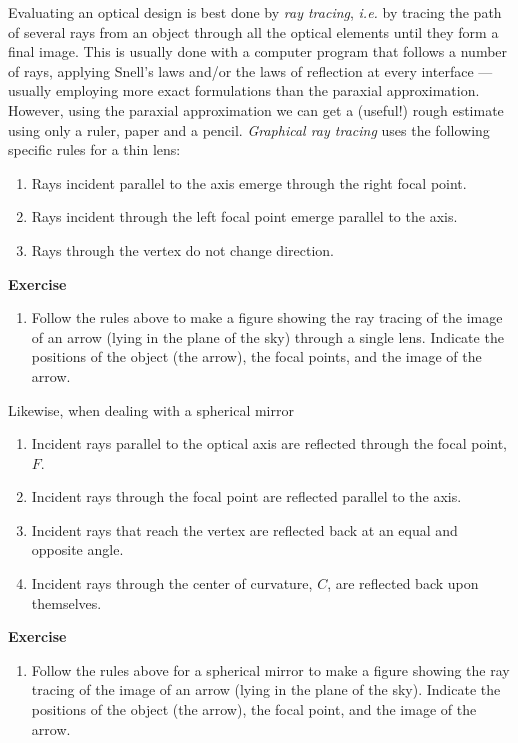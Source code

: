 \documentclass{article}
\begin{document}
Evaluating an optical design is best done by {\it ray tracing}, {\it
  i.e.} by tracing the path of several rays from an object through all
the optical elements until they form a final image. This is usually
done with a computer program that follows a number of rays, applying
Snell's laws and/or the laws of reflection at every interface ---
usually employing more exact formulations than the paraxial
approximation. However, using the paraxial approximation we can get a
(useful!) rough estimate using only a ruler, paper and a pencil. {\it
  Graphical ray tracing} uses the following specific rules for a thin lens:
\begin{enumerate}
\item Rays incident parallel to the axis emerge through the right
  focal point.
\item Rays incident through the left focal point emerge parallel to the
  axis.
\item Rays through the vertex do not change direction.
\end{enumerate}

{\bf Exercise}

\begin{enumerate}
\setcounter{enumi}{\value{count}}
\item Follow the rules above to make a figure showing the ray tracing
  of  the image of an arrow (lying in the plane of the sky) through a single lens. Indicate the
  positions of the object (the arrow), the focal points, and the image
  of the arrow.
\setcounter{count}{\value{enumi}} 
\end{enumerate}

Likewise, when dealing with a spherical mirror
\begin{enumerate}
\item Incident rays parallel to the optical axis are reflected through
  the focal point, $F$.
\item Incident rays through the focal point are reflected parallel to
  the axis.
\item Incident rays that reach the vertex are reflected back at an
  equal and opposite angle.
\item Incident rays through the center of curvature, $C$, are
  reflected back upon themselves.
\end{enumerate}

{\bf Exercise}

\begin{enumerate}
\setcounter{enumi}{\value{count}}
\item Follow the rules above for a spherical mirror to make a figure showing the ray tracing
  of  the image of an arrow (lying in the plane of the sky). Indicate the
  positions of the object (the arrow), the focal point, and the image
  of the arrow.
\setcounter{count}{\value{enumi}} 
\end{enumerate}
\end{document}
